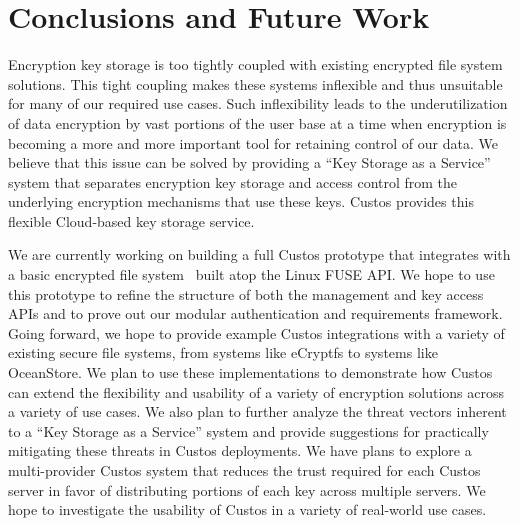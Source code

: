 \section{Conclusions and Future Work}
\label{sec:conclusion}

Encryption key storage is too tightly coupled with existing encrypted
file system solutions. This tight coupling makes these systems
inflexible and thus unsuitable for many of our required use cases.
Such inflexibility leads to the underutilization of data encryption by
vast portions of the user base at a time when encryption is becoming a
more and more important tool for retaining control of our data. We
believe that this issue can be solved by providing a ``Key Storage as
a Service'' system that separates encryption key storage and access
control from the underlying encryption mechanisms that use these
keys. Custos provides this flexible Cloud-based key storage service.

We are currently working on building a full Custos prototype that
integrates with a basic encrypted file system~\cite{sayler-os-encfs}
built atop the Linux FUSE API. We hope to use this prototype to refine
the structure of both the management and key access APIs and to prove
out our modular authentication and requirements framework. Going
forward, we hope to provide example Custos integrations with a variety
of existing secure file systems, from systems like eCryptfs to systems
like OceanStore. We plan to use these implementations to demonstrate
how Custos can extend the flexibility and usability of a variety of
encryption solutions across a variety of use cases. We also plan to
further analyze the threat vectors inherent to a ``Key Storage as a
Service'' system and provide suggestions for practically mitigating
these threats in Custos deployments. We have plans to explore a
multi-provider Custos system that reduces the trust required for each
Custos server in favor of distributing portions of each key across
multiple servers. We hope to investigate the usability of Custos in a
variety of real-world use cases.
